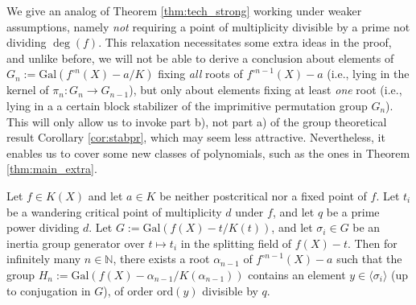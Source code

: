 \documentclass[a4paper]{amsart}
\begin{document}
    
  We give an analog of Theorem \ref{thm:tech_strong} working under weaker assumptions, namely {\it not} requiring a point of multiplicity  divisible by a prime not dividing $\deg(f)$. This relaxation necessitates some extra ideas in the proof, and 
  unlike before, we will not be able to derive a conclusion about elements of $G_n:=\textrm{Gal}(f^{\circ n}(X)-a/K)$ fixing {\it all} roots of $f^{\circ n-1}(X)-a$ (i.e., lying in the kernel of $\pi_n: G_{n}\to G_{n-1}$), but only about elements fixing at least {\it one} root (i.e., lying in a a certain block stabilizer of the imprimitive permutation group $G_n$). 
 This will only allow us to invoke part b), not part a) of the group theoretical result Corollary \ref{cor:stabpr}, which may seem less attractive. Nevertheless, it enables us to cover some new classes of polynomials, such as the ones in Theorem \ref{thm:main_extra}.
  \begin{theorem}
  \label{thm:tech_stronger}
  Let $f\in K(X)$ and let $a\in K$ be neither postcritical nor a fixed point of $f$. 
 Let $t_i$ be a wandering critical point of multiplicity $d$ under $f$, and let $q$ be a prime power dividing $d$. Let  $G:=\mathrm{Gal}(f(X)-t/K(t))$, and let $\sigma_i\in G$ be an inertia group generator over $t\mapsto t_i$ in the splitting field of $f(X)-t$.  Then for infinitely many $n\in \mathbb{N}$, there exists a root $\alpha_{n-1}$ of $f^{\circ n-1}(X)-a$ such that the group $H_n:=\textrm{Gal}(f(X)-\alpha_{n-1}/K(\alpha_{n-1}))$ contains an element $y\in \langle \sigma_i\rangle$ (up to conjugation in $G$), of order $\textrm{ord}(y)$ divisible by $q$.
  \end{theorem}
\end{document}
